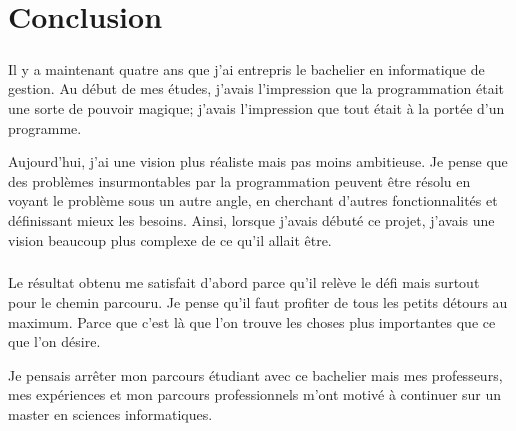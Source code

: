 \chapter{Conclusion}
\label{ch:conclusion}

\paragraph{}
Il y a maintenant quatre ans que j'ai entrepris le bachelier en informatique de gestion.
Au début de mes études, j'avais l'impression que la programmation était une sorte de pouvoir magique; j'avais l'impression que tout était à la portée d'un programme.

Aujourd'hui, j'ai une vision plus réaliste mais pas moins ambitieuse.
Je pense que des problèmes insurmontables par la programmation peuvent être résolu en voyant le problème sous un autre angle, en cherchant d'autres fonctionnalités et définissant mieux les besoins.
Ainsi, lorsque j'avais débuté ce projet, j'avais une vision beaucoup plus complexe de ce qu'il allait être.

\paragraph{}
Le résultat obtenu me satisfait d'abord parce qu'il relève le défi mais surtout pour le chemin parcouru.
Je pense qu'il faut profiter de tous les petits détours au maximum.
Parce que c'est là que l'on trouve les choses plus importantes que ce que l'on désire.

Je pensais arrêter mon parcours étudiant avec ce bachelier mais mes professeurs, mes expériences et mon parcours professionnels m'ont motivé à continuer sur un master en sciences informatiques.
